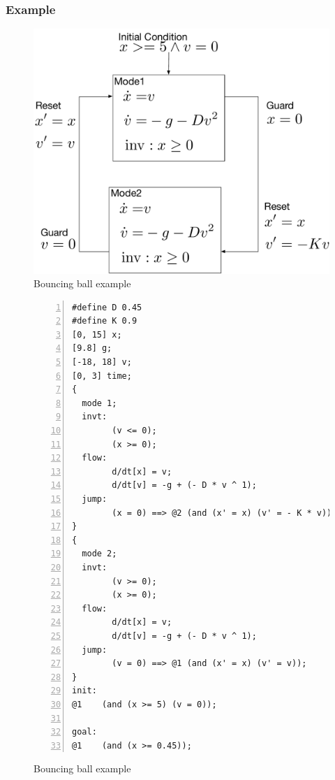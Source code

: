 \subsubsection{Example}
\begin{figure}
  \centering
  \includegraphics[width=0.5 \textwidth]{images/bouncing_ball.pdf}
  \caption{Bouncing ball example}
  \label{fig:bouncing-ball}
\end{figure}


\begin{figure}
  \centering
  \begin{Verbatim}[fontfamily=courier, frame=single, framesep=1mm,
  numbers=left, fontsize=\scriptsize]
#define D 0.45
#define K 0.9
[0, 15] x;
[9.8] g;
[-18, 18] v;
[0, 3] time;
{
  mode 1;
  invt:
        (v <= 0);
        (x >= 0);
  flow:
        d/dt[x] = v;
        d/dt[v] = -g + (- D * v ^ 1);
  jump:
        (x = 0) ==> @2 (and (x' = x) (v' = - K * v));
}
{
  mode 2;
  invt:
        (v >= 0);
        (x >= 0);
  flow:
        d/dt[x] = v;
        d/dt[v] = -g + (- D * v ^ 1);
  jump:
        (v = 0) ==> @1 (and (x' = x) (v' = v));
}
init:
@1    (and (x >= 5) (v = 0));

goal:
@1    (and (x >= 0.45));
\end{Verbatim}
  \caption{Bouncing ball example}
  \label{fig:bouncing-ball}
\end{figure}

